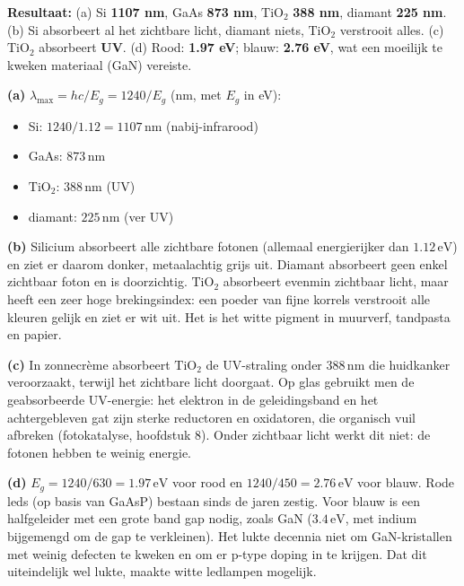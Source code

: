 \begin{oplossing}
\textbf{Resultaat:} (a) Si \textbf{1107 nm}, GaAs \textbf{873 nm}, \(\mathrm{TiO_2}\) \textbf{388 nm}, diamant \textbf{225 nm}. (b) Si absorbeert al het zichtbare licht, diamant niets, \(\mathrm{TiO_2}\) verstrooit alles. (c) \(\mathrm{TiO_2}\) absorbeert \textbf{UV}. (d) Rood: \textbf{1.97 eV}; blauw: \textbf{2.76 eV}, wat een moeilijk te kweken materiaal (GaN) vereiste.

\textbf{(a)} \(\lambda_{\max} = hc/E_g = 1240/E_g\) (nm, met \(E_g\) in eV):

\begin{itemize}
\item
  Si: \(1240/1.12 = 1107\,\mathrm{nm}\) (nabij-infrarood)
\item
  GaAs: \(873\,\mathrm{nm}\)
\item
  \(\mathrm{TiO_2}\): \(388\,\mathrm{nm}\) (UV)
\item
  diamant: \(225\,\mathrm{nm}\) (ver UV)
\end{itemize}

\textbf{(b)} Silicium absorbeert alle zichtbare fotonen (allemaal energierijker dan \(1.12\,\mathrm{eV}\)) en ziet er daarom donker, metaalachtig grijs uit. Diamant absorbeert geen enkel zichtbaar foton en is doorzichtig. \(\mathrm{TiO_2}\) absorbeert evenmin zichtbaar licht, maar heeft een zeer hoge brekingsindex: een poeder van fijne korrels verstrooit alle kleuren gelijk en ziet er wit uit. Het is het witte pigment in muurverf, tandpasta en papier.

\textbf{(c)} In zonnecrème absorbeert \(\mathrm{TiO_2}\) de UV-straling onder \(388\,\mathrm{nm}\) die huidkanker veroorzaakt, terwijl het zichtbare licht doorgaat. Op glas gebruikt men de geabsorbeerde UV-energie: het elektron in de geleidingsband en het achtergebleven gat zijn sterke reductoren en oxidatoren, die organisch vuil afbreken (fotokatalyse, hoofdstuk 8). Onder zichtbaar licht werkt dit niet: de fotonen hebben te weinig energie.

\textbf{(d)} \(E_g = 1240/630 = 1.97\,\mathrm{eV}\) voor rood en \(1240/450 = 2.76\,\mathrm{eV}\) voor blauw. Rode leds (op basis van GaAsP) bestaan sinds de jaren zestig. Voor blauw is een halfgeleider met een grote band gap nodig, zoals GaN (\(3.4\,\mathrm{eV}\), met indium bijgemengd om de gap te verkleinen). Het lukte decennia niet om GaN-kristallen met weinig defecten te kweken en om er p-type doping in te krijgen. Dat dit uiteindelijk wel lukte, maakte witte ledlampen mogelijk.
\end{oplossing}

